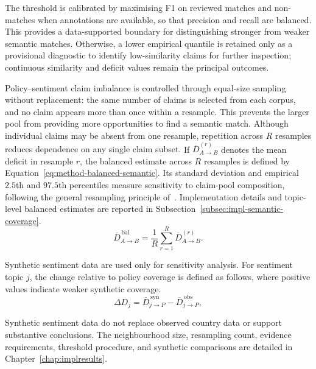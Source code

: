 The threshold is calibrated by maximising F1 on reviewed matches and non-matches when
annotations are available, so that precision and recall are balanced. This provides a
data-supported boundary for distinguishing stronger from weaker semantic matches.
Otherwise, a lower empirical quantile is retained only as a provisional diagnostic to
identify low-similarity claims for further inspection; continuous similarity and
deficit values remain the principal outcomes.

{\color{blue}Policy--sentiment claim imbalance is controlled through equal-size
sampling without replacement: the same number of claims is selected from each corpus,
and no claim appears more than once within a resample. This prevents the larger pool
from providing more opportunities to find a semantic match. Although individual
claims may be absent from one resample, repetition across \(R\) resamples reduces
dependence on any single claim subset.} If $\overline{D}^{(r)}_{A\rightarrow B}$
denotes the mean deficit in resample $r$, the balanced estimate across $R$ resamples
is defined by Equation~\ref{eq:method-balanced-semantic}. Its standard deviation and
empirical $2.5$th and $97.5$th percentiles measure sensitivity to claim-pool
composition, following the general resampling principle
of~\cite{efron1979bootstrap}. Implementation details and topic-level balanced
estimates are reported in Subsection~\ref{subsec:impl-semantic-coverage}.
\begin{equation}
\overline{D}^{\,\mathrm{bal}}_{A\rightarrow B}
=
\frac{1}{R}
\sum_{r=1}^{R}
\overline{D}^{(r)}_{A\rightarrow B}.
\label{eq:method-balanced-semantic}
\end{equation}

Synthetic sentiment data are used only for sensitivity analysis. For sentiment topic
$j$, the change relative to policy coverage is defined as follows, where positive
values indicate weaker synthetic coverage.
\begin{equation}
\Delta D_j
=
\overline{D}^{\,\mathrm{syn}}_{j\rightarrow P}
-
\overline{D}^{\,\mathrm{obs}}_{j\rightarrow P},
\label{eq:method-semantic-synthetic-change}
\end{equation}

Synthetic sentiment data do not replace observed country data or support substantive
conclusions. The neighbourhood size, resampling count, evidence requirements,
threshold procedure, and synthetic comparisons are detailed in
Chapter~\ref{chap:implresults}.

